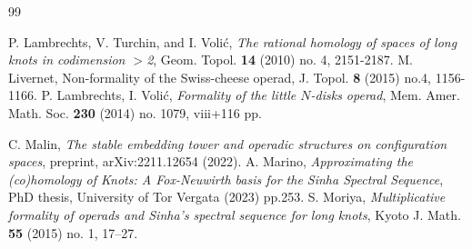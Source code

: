 \documentclass[reqno]{amsart}
\theoremstyle{definition}
\theoremstyle{plain}
\begin{document}
\begin{thebibliography}{99}




 P. Lambrechts, V. Turchin, and I. Voli\'c, {\em  The rational homology of spaces of long knots in codimension $>$2},  Geom. Topol.  {\bf 14}  (2010)  no. 4, 2151-2187. 
 M. Livernet, {Non-formality of the Swiss-cheese operad,} J. Topol. {\bf 8} (2015) no.4, 1156-1166.
 P. Lambrechts, I. Voli\'c,  {\em Formality of the little $N$-disks operad},  Mem. Amer. Math. Soc. {\bf 230}  (2014) no. 1079, viii+116 pp. 


 C. Malin, {\em The stable embedding tower and operadic structures on configuration spaces}, preprint, arXiv:2211.12654 (2022).
 A. Marino, {\em Approximating the (co)homology of Knots: A Fox-Neuwirth basis for the Sinha Spectral Sequence}, PhD thesis, University of Tor Vergata (2023) pp.253.
 S. Moriya, {\em Multiplicative formality of operads and Sinha's spectral sequence for long knots},  Kyoto J. Math. {\bf 55} (2015) no. 1, 17–27.


\end{thebibliography}
\end{document}
